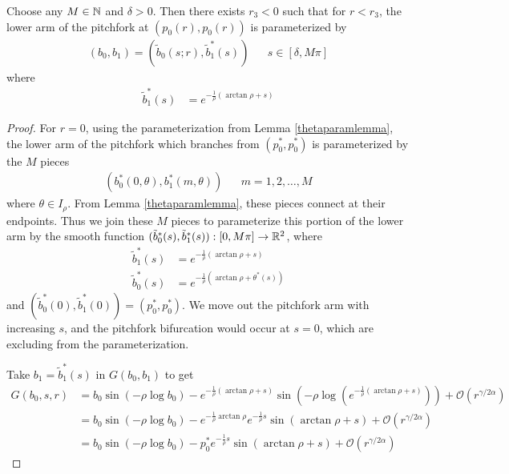 \documentclass[thesis.tex]{subfiles}
\begin{document}
\begin{lemma}\label{armpersists}
Choose any $M \in \mathbb{N}$ and $\delta > 0$. Then there exists $r_3 < 0$ such that for $r < r_3$, the lower arm of the pitchfork at $(p_0(r), p_0(r))$ is parameterized by
\begin{align*}
(b_0, b_1) = (\tilde{b}_0(s; r), \tilde{b}^*_1(s)) && s \in [\delta, M \pi]
\end{align*}
where
\begin{align*}
\tilde{b}_1^*(s) &= e^{-\frac{1}{\rho}(\arctan \rho + s)} 
\end{align*}

\begin{proof}
For $r = 0$, using the parameterization from Lemma \ref{thetaparamlemma}, the lower arm of the pitchfork which branches from $(p_0^*, p_0^*)$ is parameterized by the $M$ pieces
\begin{align}\label{Mpieceparam}
(b_0^*(0, \theta), b_1^*(m, \theta)) && m = 1, 2, \dots, M
\end{align}
where $\theta \in I_\rho$. From Lemma \ref{thetaparamlemma}, these pieces connect at their endpoints. Thus we join these $M$ pieces to  parameterize this portion of the lower arm by the smooth function $(\tilde{b}^*_0(s), \tilde{b}^*_1(s)): [0, M \pi] \rightarrow \mathbb{R}^2$, where 
\begin{align*}
\tilde{b}_1^*(s) &= e^{-\frac{1}{\rho}(\arctan \rho +s)} \\
\tilde{b}_0^*(s) &= e^{-\frac{1}{\rho}(\arctan \rho + \theta^*(s))}
\end{align*}
and $(\tilde{b}^*_0(0), \tilde{b}^*_1(0)) = (p_0^*, p_0^*)$. We move out the pitchfork arm with increasing $s$, and the pitchfork bifurcation would occur at $s = 0$, which are excluding from the parameterization.

Take $b_1 = \tilde{b}_1^*(s)$ in $G(b_0, b_1)$ to get
\begin{align*}
G(b_0, s, r) 
&= b_0 \sin(-\rho \log b_0) - e^{-\frac{1}{\rho}(\arctan \rho + s)} \sin\left(-\rho \log \left( e^{-\frac{1}{\rho}(\arctan \rho + s)}\right)\right) + \mathcal{O}(r^{\gamma/2\alpha}) \\
&= b_0 \sin(-\rho \log b_0) - e^{-\frac{1}{\rho}\arctan \rho}e^{-\frac{1}{\rho}s} \sin\left(\arctan \rho + s \right) + \mathcal{O}(r^{\gamma/2\alpha}) \\
&= b_0 \sin(-\rho \log b_0) - p_0^* e^{-\frac{1}{\rho}s} \sin\left(\arctan \rho + s \right) + \mathcal{O}(r^{\gamma/2\alpha}) 
\end{align*}


\end{proof}
\end{lemma}
\end{document}

